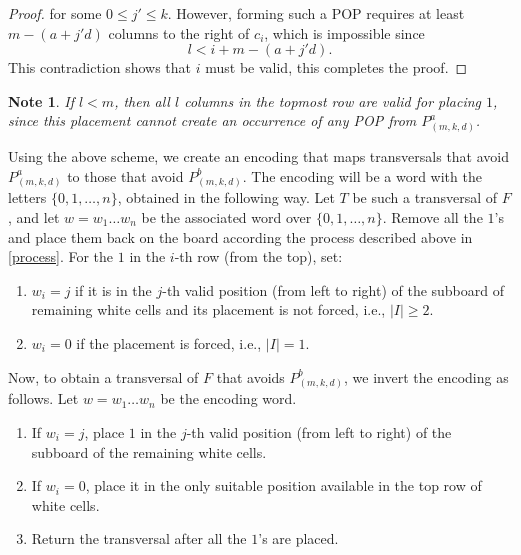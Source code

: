 \documentclass[12pt, english, a4paper]{article}
\theoremstyle{plain}
\newtheorem{note}{Note}
\theoremstyle{definition}
\theoremstyle{remark}
\begin{document}
\begin{proof}
for some \(0 \le j' \le k\). However, forming such a POP requires at least \(m - (a+j'd)\) columns to the right of \(c_i\), which is impossible since
\[
l < i + m - (a+j'd).
\]
This contradiction shows that \(i\) must be valid, this completes the proof.
\end{proof}




\begin{note}
    If \(l<m\), then all \(l\) columns in the topmost row are valid for placing \(1\), since this placement cannot create an occurrence of any POP from \(P^a_{(m,k,d)}\).
\end{note}




Using the above scheme, we create an encoding that maps transversals that avoid $P^a_{(m,k,d)}$ to those that avoid $P^b_{(m,k,d)}$. The encoding will be a word with the letters $\{0,1,\ldots , n\}$, obtained in the following way. Let $T$ be such a transversal of $F$, and let $w = w_1 \dots w_n$ be the associated word over $\{0,1,\ldots,n\}$. Remove all the $1$'s and place them back on the board according the process described above in \ref{process}. For the $1$ in the $i$-th row (from the top), set:  
\begin{enumerate}
 \item $w_i=j$ if it is in the $j$-th valid position (from left to right) of the subboard of remaining white cells and its placement is not forced, i.e., $|I|\geq 2$. 
    \item $w_i = 0$ if the placement is forced, i.e., $|I| = 1$. 
\end{enumerate}
Now, to obtain a transversal of $F$ that avoids $P^b_{(m,k,d)}$, we invert the encoding as follows. Let $w=w_1\dots w_n$ be the encoding word.
\begin{enumerate}
    \item If $w_i=j$, place $1$  in the $j$-th valid position (from left to right) of the subboard of the remaining white cells.
    \item If $w_i=0$, place it in the only suitable position available in the top row of white cells.
    \item Return the transversal after all the $1$'s are placed.
\end{enumerate}
\end{document}
